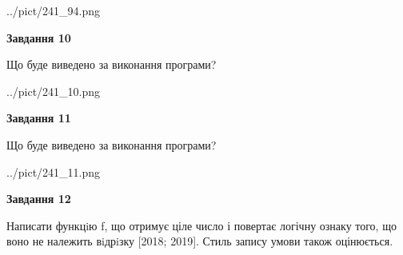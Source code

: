 \documentclass[12pt, ukrainian]{article}
\begin{document}
{\begin {large}
\begin{center}
	{../pict/241_94.png}
\end{center}
\newpage

{\begin {center}\textbf{Завдання 10}\end {center}}

Що буде виведено за виконання програми?\par
\begin{center}
	{../pict/241_10.png}
\end{center}
\newpage

{\begin {center}\textbf{Завдання 11}\end {center}}

Що буде виведено за виконання програми?\par
\begin{center}
	{../pict/241_11.png}
\end{center}
\newpage

{\begin {center}\textbf{Завдання 12}\end {center}}


Написати функцiю f, що отримує ціле число і повертає логічну ознаку того, що воно не належить вiдрiзку [2018; 2019]. Стиль запису умови також оцінюється.\par
\newpage

\end {large}}
\end{document}
